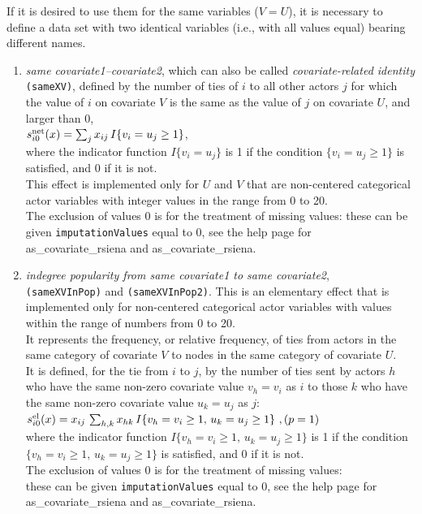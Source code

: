 \documentclass[a4paper,fleqn,11pt]{article}
\newcommand{\+}{\, + \,}
\newcommand{\sfn}[1]{\textsf{#1}}
\newcommand{\vit}{\theenumi}
\newcounter{savenumi}
\begin{document}
If it is desired to use them for the same variables ($V = U$),
it is necessary to define a data set with two identical variables
(i.e., with all values equal) bearing different names.

\begin{enumerate}
\setcounter{enumi}{\value{savenumi}}

 \item \emph{same covariate1--covariate2}, which can also be called {\em covariate-related identity}
 \texttt{(sameXV)},  defined by the
 number of ties of $i$ to all other actors $j$ for which the value of $i$
 on covariate $V$ is the same as the value of $j$ on covariate $U$,
 and larger than 0,\\[0.3em]
 $s^{\rm net}_{i\vit}(x) = \sum_j x_{ij}\, I\{v_i = u_j \geq 1\} $,\\[0.3em]
 where the indicator function $I\{v_i = u_j \} $ is 1 if the condition $\{v_i = u_j \geq 1\} $
 is satisfied, and 0 if it is not.\\
 This effect is implemented only for $U$ and $V$ that are non-centered categorical
  actor variables with integer values in the range from 0 to 20.\\
  The exclusion of values 0 is for the treatment of missing values:
  these can be given \texttt{imputationValues}  equal to 0,
  see the help page for \sfn{as\_covariate\_rsiena} and \sfn{as\_covariate\_rsiena}.

 \item \emph{indegree popularity from same covariate1 to same covariate2},\\
 \texttt{(sameXVInPop)} and \texttt{(sameXVInPop2)}.
  This is an elementary effect that is implemented only for non-centered categorical
  actor variables with values within the range of numbers from 0 to 20.\\
  It represents the frequency, or relative frequency, of ties
  from actors in the
  same category of covariate $V$ to nodes in the same category of covariate $U$.\\
 It is defined, for the tie from $i$ to $j$, by
  the number of ties sent by actors $h$ who have the same non-zero covariate value $v_h = v_i$ as $i$
  to those $k$ who have the same non-zero covariate value $u_k = u_j$ as $j$:\\[0.3em]
 $s^{\rm el}_{i\vit}(x) =  x_{ij}\, \sum_{h,k} x_{hk}\, I\{v_h = v_i \geq 1,\, u_k=u_j \geq 1\}  \ ,
             \hfill (p=1) $\\[0.3em]
 where the indicator function $ I\{v_h = v_i\geq 1,\, u_k=u_j \geq 1 \} $ is 1
 if the condition $\{v_h = v_i \geq 1,\, u_k=u_j \geq 1 \} $ is satisfied, and 0 if it is not.\\
  The exclusion of values 0 is for the treatment of missing values:\\
  these can be given \texttt{imputationValues}  equal to 0,
  see the help page for \sfn{as\_covariate\_rsiena} and \sfn{as\_covariate\_rsiena}.


\end{enumerate}
\end{document}
